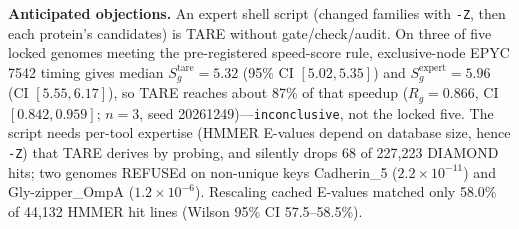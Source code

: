 \documentclass[letterpaper,twocolumn,10pt]{article}
\theoremstyle{definition}
\newcommand{\sys}{TARE\xspace}
\newcommand{\sys}{PARE\xspace}
\begin{document}
\textbf{Anticipated objections.} An expert shell script (changed families with \texttt{-Z}, then each protein's candidates) is \sys without gate/check/audit. On three of five locked genomes meeting the pre\nobreakdash-registered speed\nobreakdash-score rule, exclusive\nobreakdash-node EPYC 7542 timing gives median $S_g^{\mathrm{tare}}=5.32$ (95\% CI $[5.02, 5.35]$) and $S_g^{\mathrm{expert}}=5.96$ (CI $[5.55, 6.17]$), so \sys reaches about 87\% of that speedup ($R_g=0.866$, CI $[0.842, 0.959]$; $n{=}3$, seed 20261249)---\texttt{inconclusive}, not the locked five. The script needs per\nobreakdash-tool expertise (HMMER E-values depend on database size, hence \texttt{-Z}) that \sys derives by probing, and silently drops 68 of 227{,}223 DIAMOND hits; two genomes REFUSEd on non-unique keys Cadherin\_5 ($2.2\times10^{-11}$) and Gly-zipper\_OmpA ($1.2\times10^{-6}$). Rescaling cached E-values matched only 58.0\% of 44{,}132 HMMER hit lines (Wilson 95\% CI 57.5--58.5\%).
\end{document}

